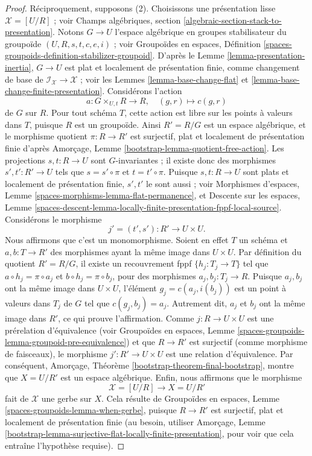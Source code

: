 \begin{proof}
\medskip\noindent
Réciproquement, supposons (2). Choisissons une présentation lisse
$\mathcal{X} = [U/R]$ ; voir Champs algébriques, section
\ref{algebraic-section-stack-to-presentation}. Notons $G \to U$ l'espace
algébrique en groupes stabilisateur du groupoïde
$(U, R, s, t, c, e, i)$ ; voir Groupoïdes en espaces, Définition
\ref{spaces-groupoids-definition-stabilizer-groupoid}.
D'après le Lemme \ref{lemma-presentation-inertia}, $G \to U$ est plat et
localement de présentation finie, comme changement de base de
$\mathcal{I}_\mathcal{X} \to \mathcal{X}$ ; voir les
Lemmes \ref{lemma-base-change-flat} et
\ref{lemma-base-change-finite-presentation}. Considérons l'action
$$
a : G \times_{U, t} R \to R, \quad (g, r) \mapsto c(g, r)
$$
de $G$ sur $R$. Pour tout schéma $T$, cette action est libre sur les points à
valeurs dans $T$, puisque $R$ est un groupoïde. Ainsi $R' = R/G$ est un espace
algébrique, et le morphisme quotient $\pi : R \to R'$ est surjectif, plat et
localement de présentation finie d'après Amorçage, Lemme
\ref{bootstrap-lemma-quotient-free-action}. Les projections
$s, t : R \to U$ sont $G$-invariantes ; il existe donc des morphismes
$s' , t' : R' \to U$ tels que $s = s' \circ \pi$ et
$t = t' \circ \pi$. Puisque $s, t : R \to U$ sont plats et localement de
présentation finie, $s', t'$ le sont aussi ; voir Morphismes d'espaces, Lemme
\ref{spaces-morphisms-lemma-flat-permanence}, et Descente sur les espaces,
Lemme
\ref{spaces-descent-lemma-locally-finite-presentation-fppf-local-source}.
Considérons le morphisme
$$
j' = (t', s') : R' \longrightarrow U \times U.
$$
Nous affirmons que c'est un monomorphisme. Soient en effet $T$ un schéma et
$a, b : T \to R'$ des morphismes ayant la même image dans $U \times U$. Par
définition du quotient $R' = R/G$, il existe un recouvrement fppf
$\{h_j : T_j \to T\}$ tel que
$a \circ h_j = \pi \circ a_j$ et $b \circ h_j = \pi \circ b_j$, pour des
morphismes $a_j, b_j : T_j \to R$. Puisque $a_j, b_j$ ont la même image dans
$U \times U$, l'élément $g_j = c(a_j, i(b_j))$ est un point à valeurs dans
$T_j$ de $G$ tel que $c(g_j, b_j) = a_j$. Autrement dit, $a_j$ et $b_j$ ont la
même image dans $R'$, ce qui prouve l'affirmation. Comme
$j : R \to U \times U$ est une prérelation d'équivalence (voir Groupoïdes en
espaces, Lemme
\ref{spaces-groupoids-lemma-groupoid-pre-equivalence})
et que $R \to R'$ est surjectif (comme morphisme de faisceaux), le morphisme
$j' : R' \to U \times U$ est une relation d'équivalence. Par conséquent,
Amorçage, Théorème \ref{bootstrap-theorem-final-bootstrap}, montre que
$X = U/R'$ est un espace algébrique. Enfin, nous affirmons que le morphisme
$$
\mathcal{X} = [U/R] \longrightarrow X = U/R'
$$
fait de $\mathcal{X}$ une gerbe sur $X$. Cela résulte de Groupoïdes
en espaces, Lemme \ref{spaces-groupoids-lemma-when-gerbe}, puisque
$R \to R'$ est surjectif, plat et localement de présentation finie (au besoin,
utiliser Amorçage, Lemme
\ref{bootstrap-lemma-surjective-flat-locally-finite-presentation}, pour voir
que cela entraîne l'hypothèse requise).
\end{proof}

